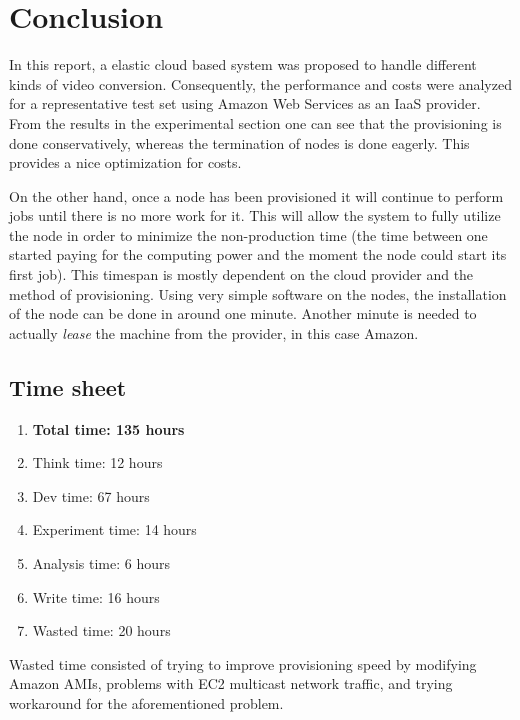 \documentclass[a4paper]{IEEEtran}
\begin{document}
\section{Conclusion}

In this report, a elastic cloud based system was proposed to handle different kinds of video conversion.
Consequently, the performance and costs were analyzed for a representative test set using Amazon Web Services as an IaaS provider.
From the results in the experimental section one can see that the provisioning is done conservatively, whereas the termination of nodes is done eagerly.
This provides a nice optimization for costs.

On the other hand, once a node has been provisioned it will continue to perform jobs until there is no more work for it. 
This will allow the system to fully utilize the node in order to minimize the non-production time (the time between one started paying for the computing power and the moment the node could start its first job).
This timespan is mostly dependent on the cloud provider and the method of provisioning.
Using very simple software on the nodes, the installation of the node can be done in around one minute.
Another minute is needed to actually \textit{lease} the machine from the provider, in this case Amazon.



\begin{appendices}

\section{Time sheet}

\begin{enumerate}
\item \textbf{Total time: 135 hours}
\item Think time: 12 hours
\item Dev time: 67 hours
\item Experiment time: 14 hours
\item Analysis time: 6 hours
\item Write time: 16 hours
\item Wasted time: 20 hours
\end{enumerate}

Wasted time consisted of trying to improve provisioning speed by modifying Amazon AMIs, problems with EC2 multicast network traffic, and trying workaround for the aforementioned problem.

\end{appendices}
\end{document}
